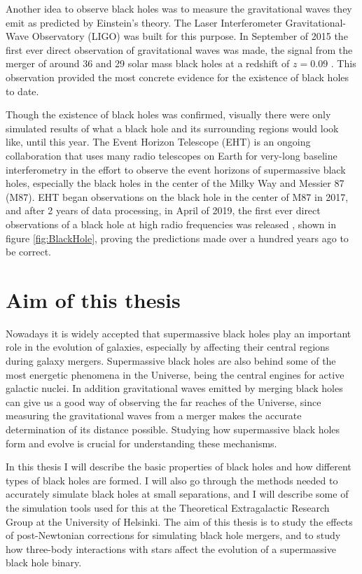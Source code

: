 \documentclass[english, oneside]{HYgradu}
\begin{document}
Another idea to observe black holes was to measure the gravitational waves they emit as predicted by Einstein's theory. The Laser Interferometer Gravitational-Wave Observatory (LIGO) was built for this purpose. In September of 2015 the first ever direct observation of gravitational waves was made, the signal from the merger of around 36 and 29 solar mass black holes at a redshift of $z = 0.09$ \citep{abbott:2016}. This observation provided the most concrete evidence for the existence of black holes to date.

Though the existence of black holes was confirmed, visually there were only simulated results of what a black hole and its surrounding regions would look like, until this year. The Event Horizon Telescope (EHT) is an ongoing collaboration that uses many radio telescopes on Earth for very-long baseline interferometry in the effort to observe the event horizons of supermassive black holes, especially the black holes in the center of the Milky Way and Messier 87 (M87). EHT began observations on the black hole in the center of M87 in 2017, and after 2 years of data processing, in April of 2019, the first ever direct observations of a black hole at high radio frequencies was released \citep{akiyama:2019}, shown in figure \ref{fig:BlackHole}, proving the predictions made over a hundred years ago to be correct.

\section{Aim of this thesis}

Nowadays it is widely accepted that supermassive black holes play an important role in the evolution of galaxies, especially by affecting their central regions during galaxy mergers. Supermassive black holes are also behind some of the most energetic phenomena in the Universe, being the central engines for active galactic nuclei. In addition gravitational waves emitted by merging black holes can give us a good way of observing the far reaches of the Universe, since measuring the gravitational waves from a merger makes the accurate determination of its distance possible. Studying how supermassive black holes form and evolve is crucial for understanding these mechanisms.

In this thesis I will describe the basic properties of black holes and how different types of black holes are formed. I will also go through the methods needed to accurately simulate black holes at small separations, and I will describe some of the simulation tools used for this at the Theoretical Extragalactic Research Group at the University of Helsinki. The aim of this thesis is to study the effects of post-Newtonian corrections for simulating black hole mergers, and to study how three-body interactions with stars affect the evolution of a supermassive black hole binary. 
\end{document}
